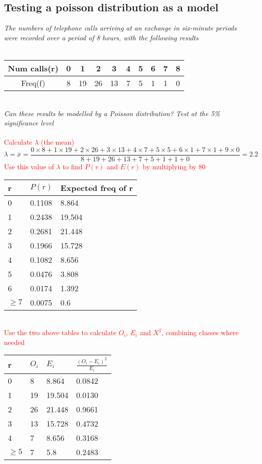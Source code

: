 \documentclass{article}[18pt]
\begin{document}
\subsection{Testing a poisson distribution as a model}
\textit{The numbers of telephone calls arriving at an exchange in six-minute periods were recorded over a period of 8 hours, with the following results}\\
\\
\begin{tabular}{|c|c|c|c|c|c|c|c|c|c|}
\hline
Num calls(r)&0&1&2&3&4&5&6&7&8\\
\hline
Freq(f)&8&19&26&13&7&5&1&1&0\\
\hline
\end{tabular}
\\
\textit{Can these results be modelled by a Poisson distribution? Test at the 5\% significance level}\\
\\
\textcolor{red}{Calculate $\lambda$ (the mean)}
$$\lambda=\overline{x}=\frac{0\times8+1\times19+2\times26+3\times13+4\times7+5\times5+6\times1+7\times1+9\times0}{8+19+26+13+7+5+1+1+0}=2.2$$
\textcolor{red}{Use this value of $\lambda$ to find $P(r)$ and $E(r)$ by multiplying by 80}\\
\begin{tabularx}{\textwidth}{|X|X|X|}
\hline
r&$P(r)$&Expected freq of r\\
\hline
0&0.1108&8.864\\
\hline
1&0.2438&19.504\\
\hline
2&0.2681&21.448\\
\hline
3&0.1966&15.728\\
\hline
4&0.1082&8.656\\
\hline
5&0.0476&3.808\\
\hline
6&0.0174&1.392\\
\hline
$\geqslant7$&0.0075&0.6\\
\hline
\end{tabularx}
\\
\textcolor{red}{Use the two above tables to calculate $O_i$, $E_i$ and $X^2$, combining classes where needed}\\
\begin{tabularx}{\textwidth}{|X|X|X|X|}
\hline
r&$O_i$&$E_i$&$\frac{(O_i-E_i)^2}{E_i}$\\
\hline
0&8&8.864&0.0842\\
\hline
1&19&19.504&0.0130\\
\hline
2&26&21.448&0.9661\\
\hline
3&13&15.728&0.4732\\
\hline
4&7&8.656&0.3168\\
\hline
$\geqslant5$&7&5.8&0.2483\\
\hline
\end{tabularx}\\
\end{document}
